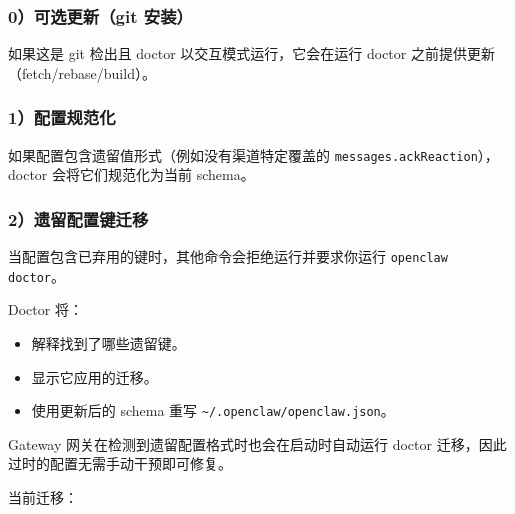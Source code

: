 \subsubsection{0）可选更新（git 安装）}


如果这是 git 检出且 doctor 以交互模式运行，它会在运行 doctor 之前提供更新（fetch/rebase/build）。

\subsubsection{1）配置规范化}


如果配置包含遗留值形式（例如没有渠道特定覆盖的 \texttt{messages.ackReaction}），doctor 会将它们规范化为当前 schema。

\subsubsection{2）遗留配置键迁移}


当配置包含已弃用的键时，其他命令会拒绝运行并要求你运行 \texttt{openclaw doctor}。

Doctor 将：

\begin{itemize}
  \item 解释找到了哪些遗留键。
  \item 显示它应用的迁移。
  \item 使用更新后的 schema 重写 \texttt{\textasciitilde{}/.openclaw/openclaw.json}。
\end{itemize}


Gateway 网关在检测到遗留配置格式时也会在启动时自动运行 doctor 迁移，因此过时的配置无需手动干预即可修复。

当前迁移：

